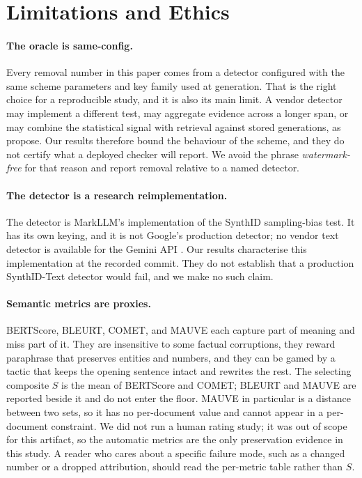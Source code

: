 \section{Limitations and Ethics}
\label{sec:limitations}

\paragraph{The oracle is same-config.}
Every removal number in this paper comes from a detector configured with the same scheme parameters and key family used at generation. That is the right choice for a reproducible study, and it is also its main limit. A vendor detector may implement a different test, may aggregate evidence across a longer span, or may combine the statistical signal with retrieval against stored generations, as \citet{dipper} propose. Our results therefore bound the behaviour of the scheme, and they do not certify what a deployed checker will report. We avoid the phrase \emph{watermark-free} for that reason and report removal relative to a named detector.

\paragraph{The detector is a research reimplementation.}
The detector is MarkLLM's implementation of the SynthID sampling-bias test. It has its own keying, and it is not Google's production detector; no vendor text detector is available for the Gemini API \citep{googleforum}. Our results characterise this implementation at the recorded commit. They do not establish that a production SynthID-Text detector would fail, and we make no such claim.

\paragraph{Semantic metrics are proxies.}
BERTScore, BLEURT, COMET, and MAUVE each capture part of meaning and miss part of it. They are insensitive to some factual corruptions, they reward paraphrase that preserves entities and numbers, and they can be gamed by a tactic that keeps the opening sentence intact and rewrites the rest. The selecting composite $S$ is the mean of BERTScore and COMET; BLEURT and MAUVE are reported beside it and do not enter the floor. MAUVE in particular is a distance between two sets, so it has no per-document value and cannot appear in a per-document constraint. We did not run a human rating study; it was out of scope for this artifact, so the automatic metrics are the only preservation evidence in this study. A reader who cares about a specific failure mode, such as a changed number or a dropped attribution, should read the per-metric table rather than $S$.

